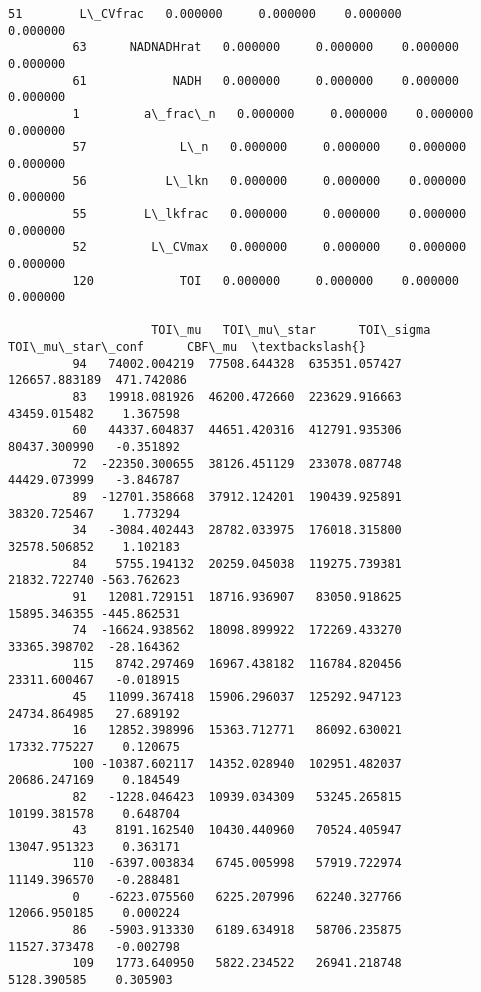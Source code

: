 \documentclass[11pt]{article}
\begin{document}
\begin{Verbatim}[commandchars=\\\{\}]
         51        L\_CVfrac   0.000000     0.000000    0.000000          0.000000   
         63      NADNADHrat   0.000000     0.000000    0.000000          0.000000   
         61            NADH   0.000000     0.000000    0.000000          0.000000   
         1         a\_frac\_n   0.000000     0.000000    0.000000          0.000000   
         57             L\_n   0.000000     0.000000    0.000000          0.000000   
         56           L\_lkn   0.000000     0.000000    0.000000          0.000000   
         55        L\_lkfrac   0.000000     0.000000    0.000000          0.000000   
         52         L\_CVmax   0.000000     0.000000    0.000000          0.000000   
         120            TOI   0.000000     0.000000    0.000000          0.000000   
         
                    TOI\_mu   TOI\_mu\_star      TOI\_sigma  TOI\_mu\_star\_conf      CBF\_mu  \textbackslash{}
         94   74002.004219  77508.644328  635351.057427     126657.883189  471.742086   
         83   19918.081926  46200.472660  223629.916663      43459.015482    1.367598   
         60   44337.604837  44651.420316  412791.935306      80437.300990   -0.351892   
         72  -22350.300655  38126.451129  233078.087748      44429.073999   -3.846787   
         89  -12701.358668  37912.124201  190439.925891      38320.725467    1.773294   
         34   -3084.402443  28782.033975  176018.315800      32578.506852    1.102183   
         84    5755.194132  20259.045038  119275.739381      21832.722740 -563.762623   
         91   12081.729151  18716.936907   83050.918625      15895.346355 -445.862531   
         74  -16624.938562  18098.899922  172269.433270      33365.398702  -28.164362   
         115   8742.297469  16967.438182  116784.820456      23311.600467   -0.018915   
         45   11099.367418  15906.296037  125292.947123      24734.864985   27.689192   
         16   12852.398996  15363.712771   86092.630021      17332.775227    0.120675   
         100 -10387.602117  14352.028940  102951.482037      20686.247169    0.184549   
         82   -1228.046423  10939.034309   53245.265815      10199.381578    0.648704   
         43    8191.162540  10430.440960   70524.405947      13047.951323    0.363171   
         110  -6397.003834   6745.005998   57919.722974      11149.396570   -0.288481   
         0    -6223.075560   6225.207996   62240.327766      12066.950185    0.000224   
         86   -5903.913330   6189.634918   58706.235875      11527.373478   -0.002798   
         109   1773.640950   5822.234522   26941.218748       5128.390585    0.305903   

\end{Verbatim}
\end{document}
